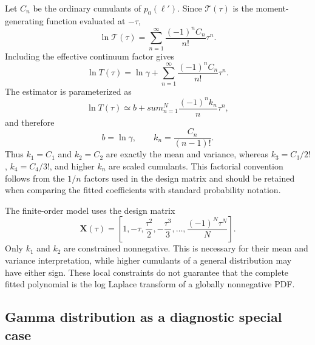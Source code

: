 Let $C_n$ be the ordinary cumulants of $p_0(\ell')$.  Since
$\mathcal T(\tau)$ is the moment-generating function evaluated at $-\tau$,
\begin{equation}
  \ln\mathcal T(\tau)
  = \sum_{n=1}^{\infty}
    \frac{(-1)^nC_n}{n!}\tau^n.
  \label{eq:app_cumulant_series}
\end{equation}
Including the effective continuum factor gives
\begin{equation}
  \ln T(\tau)
  = \ln\gamma
    + \sum_{n=1}^{\infty}
      \frac{(-1)^nC_n}{n!}\tau^n.
  \label{eq:app_cumulant_reflectance}
\end{equation}
The estimator is parameterized as
\begin{equation}
  \ln T(\tau)
  \simeq b+sum_{n=1}^{N}
    \frac{(-1)^nk_n}{n}\tau^n,
  \label{eq:app_project_parameterization}
\end{equation}
and therefore
\begin{equation}
  b=\ln\gamma,
  \qquad
  k_n=\frac{C_n}{(n-1)!}.
  \label{eq:app_coefficient_mapping}
\end{equation}
Thus $k_1=C_1$ and $k_2=C_2$ are exactly the mean and variance, whereas
$k_3=C_3/2!$, $k_4=C_4/3!$, and higher $k_n$ are scaled cumulants.  This
factorial convention follows from the $1/n$ factors used in the design matrix
and should be retained when comparing the fitted coefficients with standard
probability notation.

The finite-order model uses the design matrix
\begin{equation}
  \bm X(\tau)
  = \left[1,-\tau,\frac{\tau^2}{2},-\frac{\tau^3}{3},\ldots,
           \frac{(-1)^N\tau^N}{N}\right].
  \label{eq:app_design_matrix}
\end{equation}
Only $k_1$ and $k_2$ are constrained nonnegative.  This is necessary for their
mean and variance interpretation, while higher cumulants of a general
distribution may have either sign.  These local constraints do not guarantee
that the complete fitted polynomial is the log Laplace transform of a globally
nonnegative PDF.

\subsection{Gamma distribution as a diagnostic special case}
\label{app:gamma}

